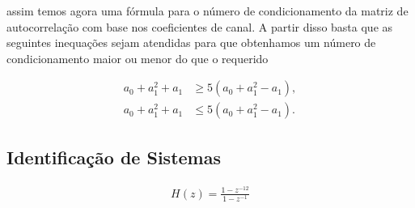 assim temos agora uma fórmula para o número de condicionamento da matriz de autocorrelação com base nos coeﬁcientes de canal. A partir disso basta que as seguintes inequações sejam atendidas para que
obtenhamos um número de condicionamento maior ou menor do que o requerido

\begin{align}
    a_{0} + a^{2}_{1} + a_{1} &\geq 5 (a_{0} + a^{2}_{1} - a_{1}), \\
    a_{0} + a^{2}_{1} + a_{1} &\leq 5 (a_{0} + a^{2}_{1} - a_{1}).
\end{align}

\clearpage


\subsection{Identificação de Sistemas} %

    
\begin{align}
    H(z) = \frac{1 - z^{-12}}{1 - z^{-1}}
\end{align}

